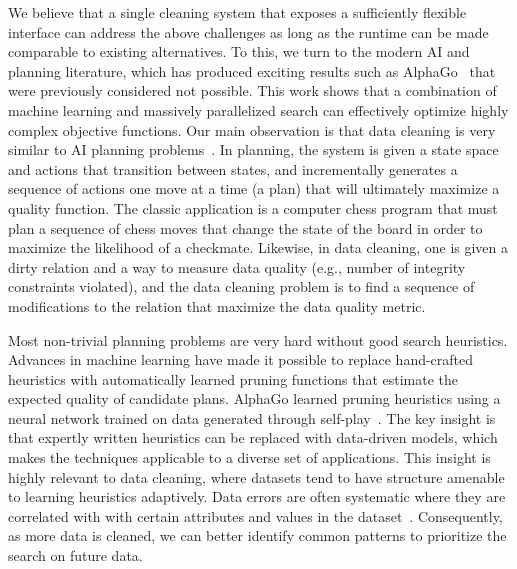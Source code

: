 We believe that a single cleaning system that exposes a sufficiently flexible interface can address the above challenges as long as the runtime can be made comparable to existing alternatives.  
To this, we turn to the modern AI and planning literature, which has produced exciting results such as AlphaGo~\cite{silver2016mastering} that were previously considered not possible.    This work shows that a combination of machine learning and massively parallelized search can effectively optimize highly complex objective functions.
Our main observation is that data cleaning is very similar to AI planning problems~\cite{russell1995modern}.
In planning, the system is given a state space and actions that transition between states, and incrementally generates a sequence of actions one move at a time (a plan) that will ultimately maximize a quality function. The classic application is a computer chess program that must plan a sequence of chess moves that change the state of the board in order to maximize the likelihood of a checkmate. Likewise, in data cleaning, one is given a dirty relation and a way to measure data quality (e.g., number of integrity constraints violated), and the data cleaning problem is to find a sequence of modifications to the relation that maximize the data quality metric.

Most non-trivial planning problems are very hard without good search heuristics.
Advances in machine learning have made it possible to replace hand-crafted heuristics with automatically learned pruning functions that estimate the expected quality of candidate plans. AlphaGo learned pruning heuristics using a neural network trained on data generated through self-play~\cite{silver2016mastering}. 
The key insight is that expertly written heuristics can be replaced with data-driven models, which makes the techniques applicable to a diverse set of applications.   
This insight is highly relevant to data cleaning, where datasets tend to have structure amenable to learning heuristics adaptively.
Data errors are often systematic where they are correlated with with certain attributes and values in the dataset~\cite{rekatsinas2017holoclean,DBLP:journals/pvldb/KrishnanWWFG16}.
Consequently, as more data is cleaned, we can better identify common patterns to prioritize the search on future data.

